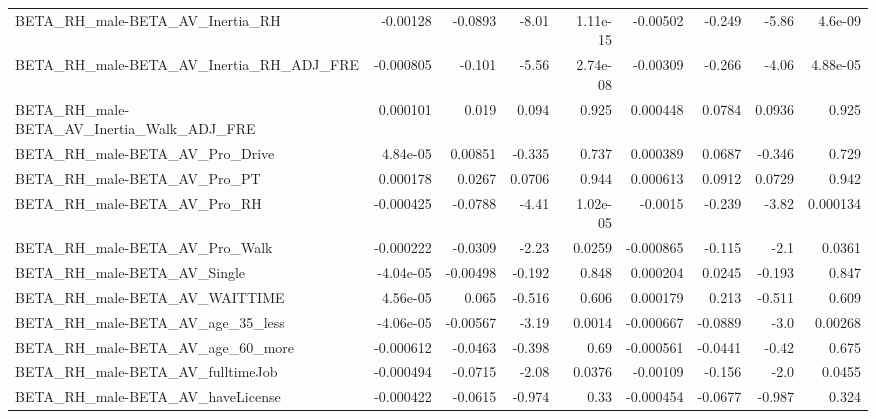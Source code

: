 \begin{tabular}{lrrrrrrrr}
BETA\_RH\_male-BETA\_AV\_Inertia\_RH                    &    -0.00128 &      -0.0893 &    -8.01 & 1.11e-15 &   -0.00502 &      -0.249 &        -5.86 &       4.6e-09 \\
BETA\_RH\_male-BETA\_AV\_Inertia\_RH\_ADJ\_FRE            &   -0.000805 &       -0.101 &    -5.56 & 2.74e-08 &   -0.00309 &      -0.266 &        -4.06 &      4.88e-05 \\
BETA\_RH\_male-BETA\_AV\_Inertia\_Walk\_ADJ\_FRE          &    0.000101 &        0.019 &    0.094 &    0.925 &   0.000448 &      0.0784 &       0.0936 &         0.925 \\
BETA\_RH\_male-BETA\_AV\_Pro\_Drive                     &    4.84e-05 &      0.00851 &   -0.335 &    0.737 &   0.000389 &      0.0687 &       -0.346 &         0.729 \\
BETA\_RH\_male-BETA\_AV\_Pro\_PT                        &    0.000178 &       0.0267 &   0.0706 &    0.944 &   0.000613 &      0.0912 &       0.0729 &         0.942 \\
BETA\_RH\_male-BETA\_AV\_Pro\_RH                        &   -0.000425 &      -0.0788 &    -4.41 & 1.02e-05 &    -0.0015 &      -0.239 &        -3.82 &      0.000134 \\
BETA\_RH\_male-BETA\_AV\_Pro\_Walk                      &   -0.000222 &      -0.0309 &    -2.23 &   0.0259 &  -0.000865 &      -0.115 &         -2.1 &        0.0361 \\
BETA\_RH\_male-BETA\_AV\_Single                        &   -4.04e-05 &     -0.00498 &   -0.192 &    0.848 &   0.000204 &      0.0245 &       -0.193 &         0.847 \\
BETA\_RH\_male-BETA\_AV\_WAITTIME                      &    4.56e-05 &        0.065 &   -0.516 &    0.606 &   0.000179 &       0.213 &       -0.511 &         0.609 \\
BETA\_RH\_male-BETA\_AV\_age\_35\_less                   &   -4.06e-05 &     -0.00567 &    -3.19 &   0.0014 &  -0.000667 &     -0.0889 &         -3.0 &       0.00268 \\
BETA\_RH\_male-BETA\_AV\_age\_60\_more                   &   -0.000612 &      -0.0463 &   -0.398 &     0.69 &  -0.000561 &     -0.0441 &        -0.42 &         0.675 \\
BETA\_RH\_male-BETA\_AV\_fulltimeJob                   &   -0.000494 &      -0.0715 &    -2.08 &   0.0376 &   -0.00109 &      -0.156 &         -2.0 &        0.0455 \\
BETA\_RH\_male-BETA\_AV\_haveLicense                   &   -0.000422 &      -0.0615 &   -0.974 &     0.33 &  -0.000454 &     -0.0677 &       -0.987 &         0.324 \\

\end{tabular}

